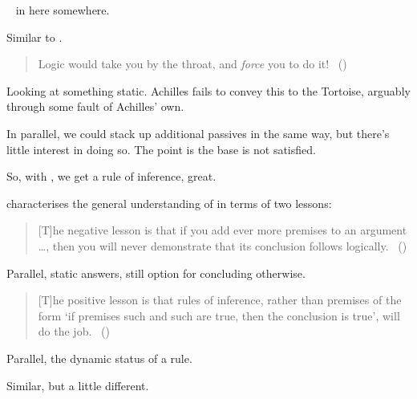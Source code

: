 \begin{note}
  \color{red}

  ~\cite{Besson:2018wz} in here somewhere. 
\end{note}

\begin{note}
  Similar to \citeauthor{Carroll:1895uj}.
  \begin{quote}
    Logic would take you by the throat, and \emph{force} you to do it!%
    \mbox{ }\hfill\mbox{(\citeyear[280]{Carroll:1895uj})}
  \end{quote}
  Looking at something static.
  Achilles fails to convey this to the Tortoise, arguably through some fault of Achilles' own.

  In parallel, we could stack up additional passives in the same way, but there's little interest in doing so.
  The point is the base \requ{} is not satisfied.
\end{note}

\begin{note}
  So, with \citeauthor{Carroll:1895uj}, we get a rule of inference, great.

  \citeauthor{Wieland:2013vf} characterises the general understanding of \textcite{Carroll:1895uj} in terms of two lessons:
  \begin{quote}
    [T]he negative lesson is that if you add ever more premises to an argument \dots, then you will never demonstrate that its conclusion follows logically.%
    \mbox{ }\hfill\mbox{(\citeyear[984]{Wieland:2013vf})}
  \end{quote}

  Parallel, static answers, still option for concluding otherwise.

  \begin{quote}
    [T]he positive lesson is that rules of inference, rather than premises of the form `if premises such and such are true, then the conclusion is true', will do the job.%
    \mbox{ }\hfill\mbox{(\citeyear[984]{Wieland:2013vf})}
  \end{quote}

  Parallel, the dynamic status of a rule.
\end{note}

\begin{note}
  Similar, but a little different.
\end{note}

